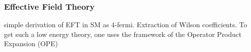 \subsubsection{Effective Field Theory}
\cite{BurasEFT} simple derivation of EFT in SM as 4-fermi. Extraction of Wilson coefficients.
To get such a
low energy theory, one uses the framework of the Operator Product Expansion (OPE)
